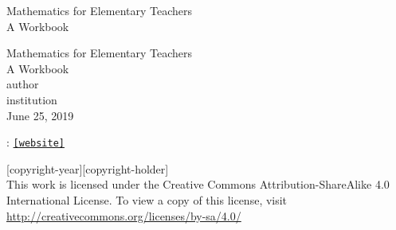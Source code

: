 \documentclass[twoside,11pt,]{book}
\newcommand{\mono}[1]{\texttt{#1}}
\begin{document}
\frontmatter
\thispagestyle{empty}
{\centering
\vspace*{0.28\textheight}
{\Huge Mathematics for Elementary Teachers}\\[2\baselineskip]
{\LARGE A Workbook}\\
}
\clearpage
\thispagestyle{empty}
\null%
\clearpage
\thispagestyle{empty}
{\centering
\vspace*{0.14\textheight}
{\Huge Mathematics for Elementary Teachers}\\[\baselineskip]
{\LARGE A Workbook}\\[3\baselineskip]
{\Large \textbraceleft{}author\textbraceright{}}\\[0.5\baselineskip]
{\Large \textbraceleft{}institution\textbraceright{}}\\[3\baselineskip]
{\Large June 25, 2019}\\}
\clearpage
\thispagestyle{empty}
\hypertarget{colophon-376568827296}{}
: \href{[website]}{\mono{[website]}}\par\medskip
\noindent\textcopyright{}[copyright-year]\quad{}[copyright-holder]\\[0.5\baselineskip]
 This work is licensed under the Creative Commons Attribution-ShareAlike 4.0 International License. To view a copy of this license, visit \href{http://creativecommons.org/licenses/by-sa/4.0/}{http:\slash{}\slash{}creativecommons.org\slash{}licenses\slash{}by-sa\slash{}4.0\slash{}}\par\medskip
{}
\null\clearpage
\setcounter{tocdepth}{2}
\renewcommand*\contentsname{Contents}
\tableofcontents
\mainmatter
%
%
\typeout{************************************************}
\typeout{************************************************}
%
\end{document}

